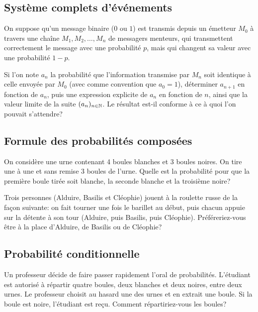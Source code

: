 \documentclass{book}
\begin{document}
\subsection*{Système complets d'événements}
\begin{Exercice}

On suppose qu'un message binaire ($0$ ou $1$) est transmis depuis un émetteur $M_0$ à travers une chaîne $M_1, M_2, \dots, M_n$ de messagers menteurs, qui transmettent correctement le message avec une probabilité $p$, mais qui changent sa valeur avec une probabilité $1-p$.

Si l'on note $a_n$ la probabilité que l'information transmise par $M_n$ soit identique à celle envoyée par $M_0$ (avec comme convention que $a_0=1$), déterminer $a_{n+1}$ en fonction de $a_n$, puis une expression explicite de $a_n$ en fonction de $n$, ainsi que la valeur limite de la suite $(a_n)_{n\in\mathbb{N}}$. Le résultat est-il conforme à ce à quoi l'on pouvait s'attendre?
\end{Exercice}

\subsection*{Formule des probabilités composées}
\begin{Exercice}
On considère une urne contenant 4 boules blanches et 3 boules noires. On tire 
une à une et sans remise 3 boules de l'urne. Quelle est la probabilité pour que la première boule tirée
soit blanche, la seconde blanche et la troisième noire?
\end{Exercice}
\begin{Exercice}
Trois personnes (Alduire, Basilis et Cléophie)
jouent à la roulette russe
de la façon suivante: on fait tourner une fois le barillet au début,
puis chacun appuie sur la détente à son tour
(Alduire, puis Basilis, puis Cléophie).
Préféreriez-vous être à la place d'Alduire, de Basilis ou de Cléophie?
\end{Exercice}
\subsection*{Probabilité conditionnelle}
\begin{Exercice}[Optimisation]
Un professeur décide de faire passer rapidement l'oral de \og{}probabilités\fg{}.
L'étudiant est autorisé à répartir quatre boules, deux blanches et deux noires,
entre deux urnes. Le professeur choisit au hasard une des urnes et en extrait
une boule. Si la boule est noire, l'étudiant est reçu.
Comment répartiriez-vous les boules?
\end{Exercice}
\end{document}
